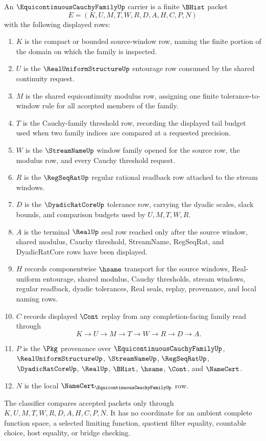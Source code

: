 \begin{definition}
\label{def:equicontinuous-cauchy-family-carrier}
An $\EquicontinuousCauchyFamilyUp$ carrier is a finite $\BHist$ packet
$$
E=(K,U,M,T,W,R,D,A,H,C,P,N)
$$
with the following displayed rows:
\begin{enumerate}
\item $K$ is the compact or bounded source-window row, naming the finite portion of the domain on which the family is inspected.
\item $U$ is the $\RealUniformStructureUp$ entourage row consumed by the shared continuity request.
\item $M$ is the shared equicontinuity modulus row, assigning one finite tolerance-to-window rule for all accepted members of the family.
\item $T$ is the Cauchy-family threshold row, recording the displayed tail budget used when two family indices are compared at a requested precision.
\item $W$ is the $\StreamNameUp$ window family opened for the source row, the modulus row, and every Cauchy threshold request.
\item $R$ is the $\RegSeqRatUp$ regular rational readback row attached to the stream windows.
\item $D$ is the $\DyadicRatCoreUp$ tolerance row, carrying the dyadic scales, slack bounds, and comparison budgets used by $U,M,T,W,R$.
\item $A$ is the terminal $\RealUp$ seal row reached only after the source window, shared modulus, Cauchy threshold, StreamName, RegSeqRat, and DyadicRatCore rows have been displayed.
\item $H$ records componentwise $\hsame$ transport for the source windows, Real-uniform entourage, shared modulus, Cauchy thresholds, stream windows, regular readback, dyadic tolerances, Real seals, replay, provenance, and local naming rows.
\item $C$ records displayed $\Cont$ replay from any completion-facing family read through
$$
K\longrightarrow U\longrightarrow M\longrightarrow T\longrightarrow W\longrightarrow R\longrightarrow D\longrightarrow A .
$$
\item $P$ is the $\Pkg$ provenance over $\EquicontinuousCauchyFamilyUp$, $\RealUniformStructureUp$, $\StreamNameUp$, $\RegSeqRatUp$, $\DyadicRatCoreUp$, $\RealUp$, $\BHist$, $\hsame$, $\Cont$, and $\NameCert$.
\item $N$ is the local $\NameCert_{\EquicontinuousCauchyFamilyUp}$ row.
\end{enumerate}
The classifier compares accepted packets only through $K,U,M,T,W,R,D,A,H,C,P,N$. It has no coordinate for an ambient complete function space, a selected limiting function, quotient filter equality, countable choice, host equality, or bridge checking.
\end{definition}

